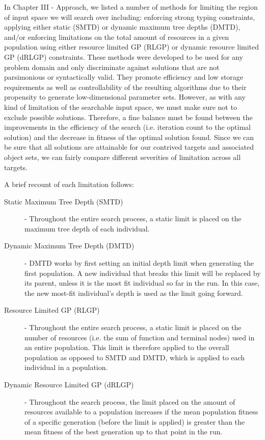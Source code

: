 \documentclass[12pt]{report} 	%
\numberwithin{figure}{chapter}
\numberwithin{table}{chapter}
\numberwithin{equation}{chapter}
\begin{document}
\begin{flushleft}
In Chapter III - Approach, we listed a number of methods for limiting the region of input space we will search over including: enforcing strong typing constraints, applying either static (SMTD) or dynamic maximum tree depths (DMTD), and/or enforcing limitations on the total amount of resources in a given population using either resource limited GP (RLGP) or dynamic resource limited GP (dRLGP) constraints. These methods were developed to be used for any problem domain and only discriminate against solutions that are not parsimonious or syntactically valid. They promote efficiency and low storage requirements as well as controllability of the resulting algorithms due to their propensity to generate low-dimensional parameter sets. However, as with any kind of limitation of the searchable input space, we must make sure not to exclude possible solutions. Therefore, a fine balance must be found between the improvements in the efficiency of the search (i.e. iteration count to the optimal solution) and the decrease in fitness of the optimal solution found. Since we can be sure that all solutions are attainable for our contrived targets and associated object sets, we can fairly compare different severities of limitation across all targets.

A brief recount of each limitation follows:
\begin{description}
\item [Static Maximum Tree Depth (SMTD)] - Throughout the entire search process, a static limit is placed on the maximum tree depth of each individual.
\item [Dynamic Maximum Tree Depth (DMTD)] - DMTD works by first setting an initial depth limit when generating the first population. A new individual that breaks this limit will be replaced by its parent, unless it is the most fit individual so far in the run. In this case, the new most-fit individual's depth is used as the limit going forward.
\item [Resource Limited GP (RLGP)] - Throughout the entire search process, a static limit is placed on the number of resources (i.e. the sum of function and terminal nodes) used in an entire population. This limit is therefore applied to the overall population as opposed to SMTD and DMTD, which is applied to each individual in a population.
\item [Dynamic Resource Limited GP (dRLGP)] - Throughout the search process, the limit placed on the amount of resources available to a population increases if the mean population fitness of a specific generation (before the limit is applied) is greater than the mean fitness of the best generation up to that point in the run. 
\end{description}


\end{flushleft}
\end{document}
